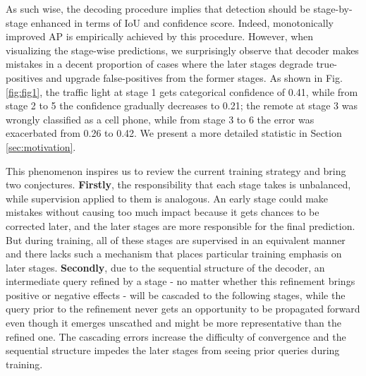 \documentclass[10pt,twocolumn,letterpaper]{article}
\begin{document}
As such wise, the decoding procedure implies that detection should be stage-by-stage enhanced in terms of IoU and confidence score. Indeed, monotonically improved AP is empirically achieved by this procedure. However, when visualizing the stage-wise predictions, we surprisingly observe that decoder makes mistakes in a decent proportion of cases where the later stages degrade true-positives and upgrade false-positives from the former stages. As shown in Fig.\ref{fig:fig1}, the traffic light at stage 1 gets categorical confidence of 0.41, while from stage 2 to 5 the confidence gradually decreases to 0.21; the remote at stage 3 was wrongly classified as a cell phone, while from stage 3 to 6 the error was exacerbated from 0.26 to 0.42. We present a more detailed statistic in Section \ref{sec:motivation}.




This phenomenon inspires us to review the current training strategy and bring two conjectures. 
\textbf{Firstly}, the responsibility that each stage takes is unbalanced, while supervision applied to them is analogous. An early stage could make mistakes without causing too much impact because it gets chances to be corrected later, and the later stages are more responsible for the final prediction. But during training, all of these stages are supervised in an equivalent manner and there lacks such a mechanism that places particular training emphasis on later stages.  
\textbf{Secondly}, due to the sequential structure of the decoder, an intermediate query refined by a stage - no matter whether this refinement brings positive or negative effects - will be cascaded to the following stages, while the query prior to the refinement never gets an opportunity to be propagated forward even though it emerges unscathed and might be more representative than the refined one. The cascading errors increase the difficulty of convergence and the sequential structure impedes the later stages from seeing prior queries during training.
\end{document}
